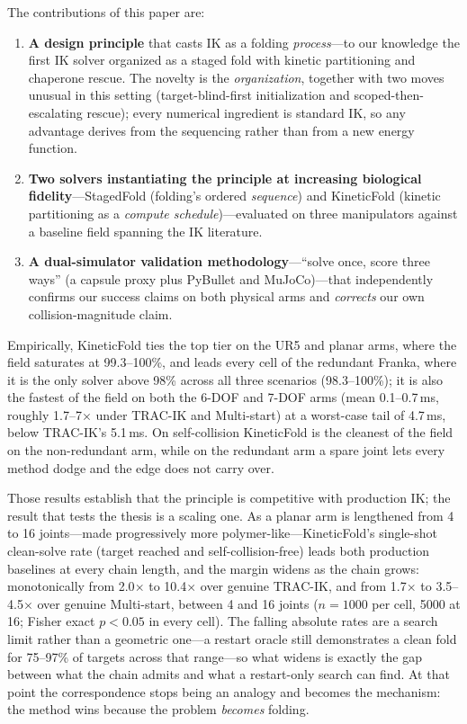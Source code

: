 \documentclass[10pt,conference]{IEEEtran}
\begin{document}
The contributions of this paper are:

\begin{enumerate}
\item \textbf{A design principle} that casts IK as a folding \emph{process}---to
our knowledge the first IK solver organized as a staged fold with kinetic
partitioning and chaperone rescue. The novelty is the \emph{organization},
together with two moves unusual in this setting (target-blind-first
initialization and scoped-then-escalating rescue); every numerical ingredient is
standard IK, so any advantage derives from the sequencing rather than from a new
energy function.
\item \textbf{Two solvers instantiating the principle at increasing biological
fidelity}---StagedFold (folding's ordered \emph{sequence}) and KineticFold
(kinetic partitioning as a \emph{compute schedule})---evaluated on three
manipulators against a baseline field spanning the IK literature.
\item \textbf{A dual-simulator validation methodology}---``solve once, score
three ways'' (a capsule proxy plus PyBullet and MuJoCo)---that independently
confirms our success claims on both physical arms and \emph{corrects} our own
collision-magnitude claim.
\end{enumerate}

Empirically, KineticFold ties the top tier on the UR5 and planar arms, where the
field saturates at 99.3--100\%, and leads every cell of the redundant Franka,
where it is the only solver above 98\% across all three scenarios
(98.3--100\%); it is also the fastest of the field on both the 6-DOF and 7-DOF
arms (mean 0.1--0.7\,ms, roughly 1.7--7$\times$ under TRAC-IK and Multi-start)
at a worst-case tail of 4.7\,ms, below TRAC-IK's 5.1\,ms. On self-collision
KineticFold is the cleanest of the field on the non-redundant arm, while on the
redundant arm a spare joint lets every method dodge and the edge does not carry
over.

Those results establish that the principle is competitive with production IK;
the result that tests the thesis is a scaling one. As a planar arm is lengthened
from 4 to 16 joints---made progressively more polymer-like---KineticFold's
single-shot clean-solve rate (target reached and self-collision-free) leads both
production baselines at every chain length, and the margin widens as the chain
grows: monotonically from 2.0$\times$ to 10.4$\times$ over genuine TRAC-IK, and
from 1.7$\times$ to 3.5--4.5$\times$ over genuine Multi-start, between 4 and 16
joints ($n = 1000$ per cell, 5000 at 16; Fisher exact $p < 0.05$ in every cell). The falling
absolute rates are a search limit rather than a geometric one---a restart oracle
still demonstrates a clean fold for 75--97\% of targets across that range---so
what widens is exactly the gap between what the chain admits and what a
restart-only search can find. At that point the
correspondence stops being an analogy and becomes the mechanism: the method wins
because the problem \emph{becomes} folding.
\end{document}
